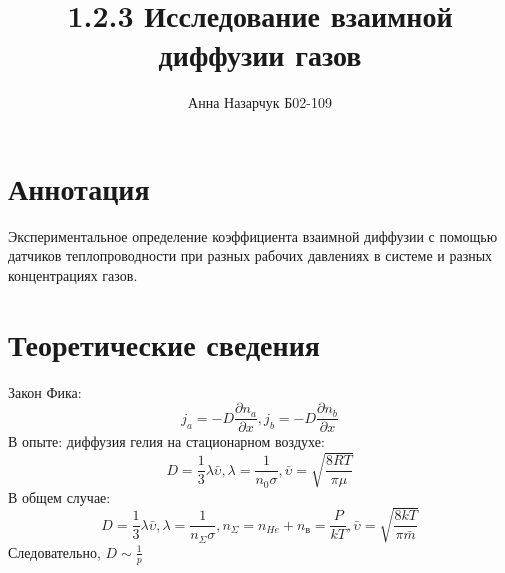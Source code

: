 \documentclass[a4paper,12pt]{article} %
\author{Анна Назарчук Б02-109}
\title{1.2.3 Исследование взаимной диффузии газов}
\date{}
\begin{document}
\maketitle
\section{Аннотация}
Экспериментальное определение коэффициента взаимной диффузии с помощью датчиков теплопроводности при разных рабочих давлениях в системе и разных концентрациях газов. 
\section{Теоретические сведения}
Закон Фика:
\begin{equation}
j_a=-D\frac{\partial n_a}{\partial x}, j_b=-D\frac{\partial n_b}{\partial x}
\end{equation}
В опыте: диффузия гелия на стационарном воздухе:
\begin{equation}
D=\frac{1}{3}\lambda \bar{\upsilon}, \lambda = \frac{1}{n_0\sigma}, \bar{\upsilon} = \sqrt{\frac{8RT}{\pi \mu}}
\end{equation}
В общем случае:
\begin{equation}
D = \frac{1}{3}\lambda \bar{\upsilon}, \lambda = \frac{1}{n_{\Sigma}\sigma}, n_{\Sigma} = n_{He}+n_{\text{в}}=\frac{P}{kT}, \bar{\upsilon} = \sqrt{\frac{8kT}{\pi \bar{m}}}
\end{equation}
Следовательно, $D\sim \frac{1}{p}$
\end{document}
